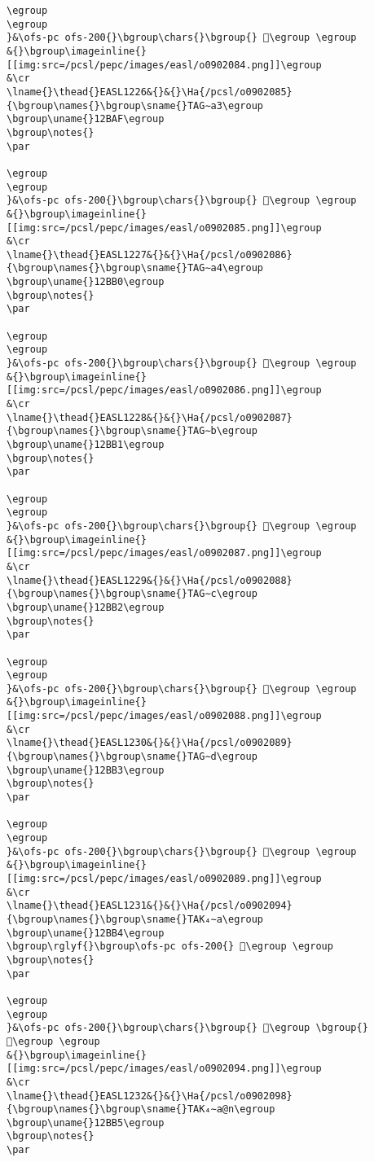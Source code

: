 \begin{verbatim}
\egroup
\egroup
}&\ofs-pc ofs-200{}\bgroup\chars{}\bgroup{} 𒮮\egroup \egroup
&{}\bgroup\imageinline{}[[img:src=/pcsl/pepc/images/easl/o0902084.png]]\egroup
&\cr
\lname{}\thead{}EASL1226&{}&{}\Ha{/pcsl/o0902085}{\bgroup\names{}\bgroup\sname{}TAG∼a3\egroup
\bgroup\uname{}12BAF\egroup
\bgroup\notes{}
\par 

\egroup
\egroup
}&\ofs-pc ofs-200{}\bgroup\chars{}\bgroup{} 𒮯\egroup \egroup
&{}\bgroup\imageinline{}[[img:src=/pcsl/pepc/images/easl/o0902085.png]]\egroup
&\cr
\lname{}\thead{}EASL1227&{}&{}\Ha{/pcsl/o0902086}{\bgroup\names{}\bgroup\sname{}TAG∼a4\egroup
\bgroup\uname{}12BB0\egroup
\bgroup\notes{}
\par 

\egroup
\egroup
}&\ofs-pc ofs-200{}\bgroup\chars{}\bgroup{} 𒮰\egroup \egroup
&{}\bgroup\imageinline{}[[img:src=/pcsl/pepc/images/easl/o0902086.png]]\egroup
&\cr
\lname{}\thead{}EASL1228&{}&{}\Ha{/pcsl/o0902087}{\bgroup\names{}\bgroup\sname{}TAG∼b\egroup
\bgroup\uname{}12BB1\egroup
\bgroup\notes{}
\par 

\egroup
\egroup
}&\ofs-pc ofs-200{}\bgroup\chars{}\bgroup{} 𒮱\egroup \egroup
&{}\bgroup\imageinline{}[[img:src=/pcsl/pepc/images/easl/o0902087.png]]\egroup
&\cr
\lname{}\thead{}EASL1229&{}&{}\Ha{/pcsl/o0902088}{\bgroup\names{}\bgroup\sname{}TAG∼c\egroup
\bgroup\uname{}12BB2\egroup
\bgroup\notes{}
\par 

\egroup
\egroup
}&\ofs-pc ofs-200{}\bgroup\chars{}\bgroup{} 𒮲\egroup \egroup
&{}\bgroup\imageinline{}[[img:src=/pcsl/pepc/images/easl/o0902088.png]]\egroup
&\cr
\lname{}\thead{}EASL1230&{}&{}\Ha{/pcsl/o0902089}{\bgroup\names{}\bgroup\sname{}TAG∼d\egroup
\bgroup\uname{}12BB3\egroup
\bgroup\notes{}
\par 

\egroup
\egroup
}&\ofs-pc ofs-200{}\bgroup\chars{}\bgroup{} 𒮳\egroup \egroup
&{}\bgroup\imageinline{}[[img:src=/pcsl/pepc/images/easl/o0902089.png]]\egroup
&\cr
\lname{}\thead{}EASL1231&{}&{}\Ha{/pcsl/o0902094}{\bgroup\names{}\bgroup\sname{}TAK₄∼a\egroup
\bgroup\uname{}12BB4\egroup
\bgroup\rglyf{}\bgroup\ofs-pc ofs-200{} 𒮴\egroup \egroup
\bgroup\notes{}
\par 

\egroup
\egroup
}&\ofs-pc ofs-200{}\bgroup\chars{}\bgroup{} 𒮶\egroup \bgroup{} 𒮴\egroup \egroup
&{}\bgroup\imageinline{}[[img:src=/pcsl/pepc/images/easl/o0902094.png]]\egroup
&\cr
\lname{}\thead{}EASL1232&{}&{}\Ha{/pcsl/o0902098}{\bgroup\names{}\bgroup\sname{}TAK₄∼a@n\egroup
\bgroup\uname{}12BB5\egroup
\bgroup\notes{}
\par 


\end{verbatim}
